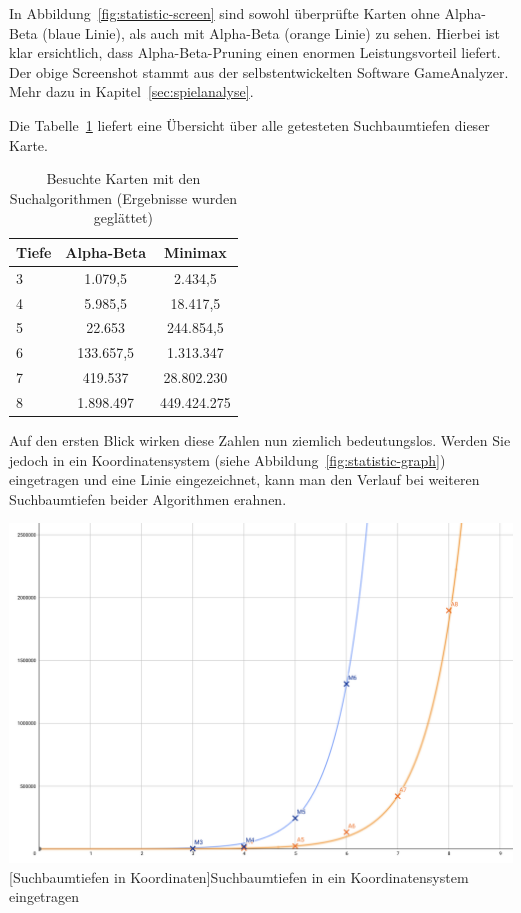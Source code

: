 In Abbildung~\ref{fig:statistic-screen} sind sowohl \"uberpr\"ufte Karten ohne Alpha-Beta (blaue Linie), als auch mit Alpha-Beta (orange Linie) zu sehen.
Hierbei ist klar ersichtlich, dass Alpha-Beta-Pruning einen enormen Leistungsvorteil liefert.
Der obige Screenshot stammt aus der selbstentwickelten Software GameAnalyzer.
Mehr dazu in Kapitel~\ref{sec:spielanalyse}.

Die Tabelle~\ref{tab:search-depth} liefert eine \"Ubersicht \"uber alle getesteten Suchbaumtiefen dieser Karte.

\vspace{1em}
\begin{table}[!h]
    \centering
    \begin{tabular}{|l|c|c|}
        \hline
        \textbf{Tiefe} & \textbf{Alpha-Beta} & \textbf{Minimax}\\
        \hline
        3 & 1.079,5 & 2.434,5\\
        \hline
        4 & 5.985,5 & 18.417,5\\
        \hline
        5 & 22.653 & 244.854,5\\
        \hline
        6 & 133.657,5 & 1.313.347\\
        \hline
        7 & 419.537 & 28.802.230\\
        \hline
        8 & 1.898.497 & 449.424.275\\
        \hline
    \end{tabular}
    \caption{Besuchte Karten mit den Suchalgorithmen (Ergebnisse wurden gegl\"attet)}
    \label{tab:search-depth}
\end{table}
\vspace{1em}

Auf den ersten Blick wirken diese Zahlen nun ziemlich bedeutungslos.
Werden Sie jedoch in ein Koordinatensystem (siehe Abbildung~\ref{fig:statistic-graph}) eingetragen und eine Linie eingezeichnet, kann man den Verlauf bei weiteren Suchbaumtiefen beider Algorithmen erahnen.

\vspace{1em}
\begin{minipage}{\linewidth}
    \centering
    \includegraphics[width=0.7\linewidth]{pics/statistic-graph}
    [Suchbaumtiefen in Koordinaten]{Suchbaumtiefen in ein Koordinatensystem eingetragen}
    \label{fig:statistic-graph}
\end{minipage}
\vspace{1em}

